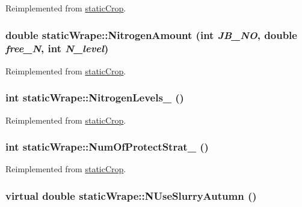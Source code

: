 Reimplemented from \hyperlink{classstatic_crop_a9b67ef1ae531a3afb32b63a4aeb5916b}{staticCrop}.\hypertarget{classstatic_wrape_a91d0074f8628913cbc19368d40ba3d38}{
\subsubsection[{NitrogenAmount}]{\setlength{\rightskip}{0pt plus 5cm}double staticWrape::NitrogenAmount (int {\em JB\_\-NO}, \/  double {\em free\_\-N}, \/  int {\em N\_\-level})}}
\label{classstatic_wrape_a91d0074f8628913cbc19368d40ba3d38}


Reimplemented from \hyperlink{classstatic_crop_af3aa85321a8a75406f8a0751b71587d0}{staticCrop}.\hypertarget{classstatic_wrape_a69e388d2e7b1fdafb864ea94277c546a}{
\subsubsection[{NitrogenLevels\_\-}]{\setlength{\rightskip}{0pt plus 5cm}int staticWrape::NitrogenLevels\_\- ()}}
\label{classstatic_wrape_a69e388d2e7b1fdafb864ea94277c546a}


Reimplemented from \hyperlink{classstatic_crop_a32b69ed138beaed150efa74d18e82d8e}{staticCrop}.\hypertarget{classstatic_wrape_afc484a4521f9840417ed6e2b5033b022}{
\subsubsection[{NumOfProtectStrat\_\-}]{\setlength{\rightskip}{0pt plus 5cm}int staticWrape::NumOfProtectStrat\_\- ()}}
\label{classstatic_wrape_afc484a4521f9840417ed6e2b5033b022}


Reimplemented from \hyperlink{classstatic_crop_a4d3d767f569f48eb68ffa76822302467}{staticCrop}.\hypertarget{classstatic_wrape_a20762299252b95a5d750f27bbf56dc66}{
\subsubsection[{NUseSlurryAutumn}]{\setlength{\rightskip}{0pt plus 5cm}virtual double staticWrape::NUseSlurryAutumn ()}}
\label{classstatic_wrape_a20762299252b95a5d750f27bbf56dc66}


